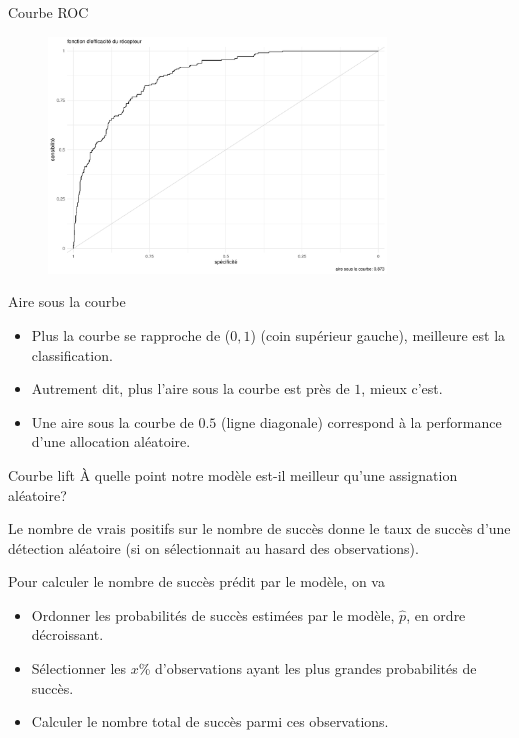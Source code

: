 \documentclass[
  ignorenonframetext,
]{beamer}
\providecommand{\tightlist}{%
  \setlength{\itemsep}{0pt}\setlength{\parskip}{0pt}}\usepackage{longtable,booktabs,array}
\begin{document}
\begin{frame}{Courbe ROC}
\protect\hypertarget{courbe-roc}{}
\begin{figure}

{\centering \includegraphics[width=0.8\textwidth,height=\textheight]{MATH60602-diapos6_files/figure-beamer/unnamed-chunk-15-1.pdf}

}

\end{figure}
\end{frame}

\begin{frame}{Aire sous la courbe}
\protect\hypertarget{aire-sous-la-courbe}{}
\begin{itemize}
\tightlist
\item
  Plus la courbe se rapproche de (\(0, 1\)) (coin supérieur gauche),
  meilleure est la classification.
\item
  Autrement dit, plus l'aire sous la courbe est près de \(1\), mieux
  c'est.
\item
  Une aire sous la courbe de \(0.5\) (ligne diagonale) correspond à la
  performance d'une allocation aléatoire.
\end{itemize}
\end{frame}

\begin{frame}{Courbe lift}
\protect\hypertarget{courbe-lift}{}
À quelle point notre modèle est-il meilleur qu'une assignation
aléatoire?

Le nombre de vrais positifs sur le nombre de succès donne le taux de
succès d'une détection aléatoire (si on sélectionnait au hasard des
observations).

Pour calculer le nombre de succès prédit par le modèle, on va

\begin{itemize}
\tightlist
\item
  Ordonner les probabilités de succès estimées par le modèle,
  \(\widehat{p}\), en ordre décroissant.
\item
  Sélectionner les \(x\)\% d'observations ayant les plus grandes
  probabilités de succès.
\item
  Calculer le nombre total de succès parmi ces observations.
\end{itemize}
\end{frame}
\end{document}
